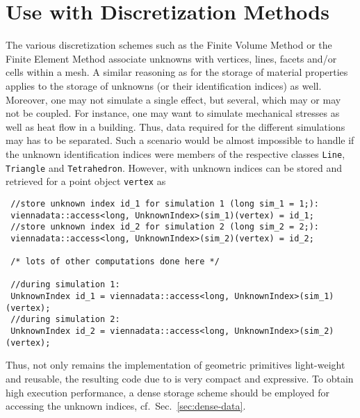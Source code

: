 \section{Use with Discretization Methods}
The various discretization schemes such as the Finite Volume Method or the Finite Element Method associate unknowns with vertices, lines, facets and/or cells within a mesh.
A similar reasoning as for the storage of material properties applies to the storage of unknowns (or their identification indices) as well. Moreover, one may not simulate a single effect, but several, which may or may not be coupled. For instance, one may want to simulate mechanical stresses as well as heat flow in a building. Thus, data required for the different simulations may has to be separated. Such a scenario would be almost impossible to handle if the unknown identification indices were members of the respective classes \lstinline|Line|, \lstinline|Triangle| and \lstinline|Tetrahedron|. However, with {\ViennaData} unknown indices can be stored and retrieved for a point object \lstinline|vertex| as
\begin{lstlisting}
 //store unknown index id_1 for simulation 1 (long sim_1 = 1;):
 viennadata::access<long, UnknownIndex>(sim_1)(vertex) = id_1; 
 //store unknown index id_2 for simulation 2 (long sim_2 = 2;):
 viennadata::access<long, UnknownIndex>(sim_2)(vertex) = id_2; 

 /* lots of other computations done here */

 //during simulation 1:
 UnknownIndex id_1 = viennadata::access<long, UnknownIndex>(sim_1)(vertex); 
 //during simulation 2:
 UnknownIndex id_2 = viennadata::access<long, UnknownIndex>(sim_2)(vertex); 
\end{lstlisting}
Thus, not only remains the implementation of geometric primitives light-weight and reusable, the resulting code due to {\ViennaData} is very compact and expressive. 
To obtain high execution performance, a dense storage scheme should be employed for accessing the unknown indices, cf.~Sec.~\ref{sec:dense-data}.


